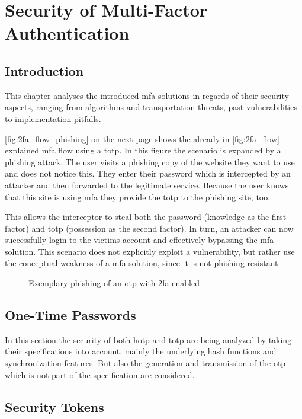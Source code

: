 \chapter{Security of Multi-Factor Authentication}

\section{Introduction}

This chapter analyses the introduced \gls{mfa} solutions in regards of their security aspects, ranging from algorithms and transportation threats, past vulnerabilities to implementation pitfalls.

\autoref{fig:2fa_flow_phishing} on the next page shows the already in \autoref{fig:2fa_flow} explained \gls{mfa} flow using a \gls{totp}. In this figure the scenario is expanded by a phishing attack. The user visits a phishing copy of the website they want to use and does not notice this. They enter their password which is intercepted by an attacker and then forwarded to the legitimate service. Because the user knows that this site is using \gls{mfa} they provide the \gls{totp} to the phishing site, too.

This allows the interceptor to steal both the password (knowledge as the first factor) and \gls{totp} (possession as the second factor). In turn, an attacker can now successfully login to the victims account and effectively bypassing the \gls{mfa} solution. This scenario does not explicitly exploit a vulnerability, but rather use the conceptual weakness of a \gls{mfa} solution, since it is not phishing resistant.

\newpage

\begin{figure}[hbt]
	\centering
	
	\caption[Exemplary phishing of an \gls{otp} with \gls{2fa} enabled]{Exemplary phishing of an \gls{otp} with \gls{2fa} enabled\footnotemark}
	\label{fig:2fa_flow_phishing}
\end{figure}

\section{One-Time Passwords}
\label{sec:totp_sec}

In this section the security of both \gls{hotp} and \gls{totp} are being analyzed by taking their specifications into account, mainly the underlying hash functions and synchronization features. But also the generation and transmission of the \gls{otp} which is not part of the specification are considered.



\section{Security Tokens}
\label{sec:tokens}



